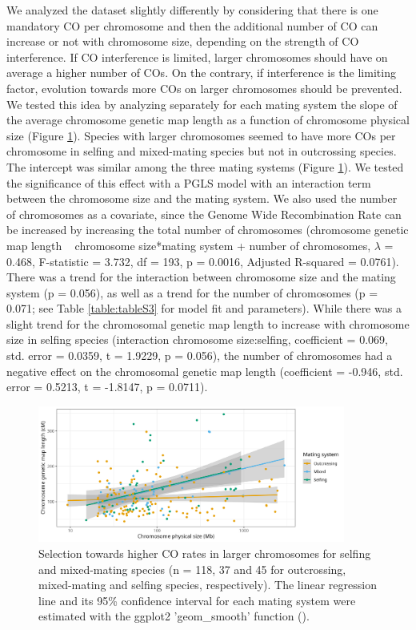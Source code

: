 \documentclass{article}
\begin{document}
We analyzed the dataset slightly differently by considering that there is one mandatory CO per chromosome and then the additional number of CO can increase or not with chromosome size, depending on the strength of CO interference. If CO interference is limited, larger chromosomes should have on average a higher number of COs. On the contrary, if interference is the limiting factor, evolution towards more COs on larger chromosomes should be prevented. We tested this idea by analyzing separately for each mating system the slope of the average chromosome genetic map length as a function of chromosome physical size (Figure \ref{figure:Fig4}). Species with larger chromosomes seemed to have more COs per chromosome in selfing and mixed-mating species but not in outcrossing species. The intercept was similar among the three mating systems (Figure \ref{figure:Fig4}). We tested the significance of this effect with a PGLS model with an interaction term between the chromosome size and the mating system. We also used the number of chromosomes as a covariate, since the Genome Wide Recombination Rate can be increased by increasing the total number of chromosomes (chromosome genetic map length ~ chromosome size*mating system + number of chromosomes, $\lambda$ = 0.468, F-statistic = 3.732, df = 193, p = 0.0016, Adjusted R-squared = 0.0761). There was a trend for the interaction between chromosome size and the mating system (p = 0.056), as well as a trend for the number of chromosomes (p = 0.071; see Table \ref{table:tableS3} for model fit and parameters). While there was a slight trend for the chromosomal genetic map length to increase with chromosome size in selfing species (interaction chromosome size:selfing, coefficient = 0.069, std. error = 0.0359, t = 1.9229, p = 0.056), the number of chromosomes had a negative effect on the chromosomal genetic map length (coefficient = -0.946, std. error = 0.5213, t = -1.8147, p = 0.0711).




\begin{figure}[h!]
  \includegraphics[width=0.9\textwidth]{figures/Fig4.jpeg}
  \centering
  \caption{Selection towards higher CO rates in larger chromosomes for selfing and mixed-mating species (n = 118, 37 and 45 for outcrossing, mixed-mating and selfing species, respectively). The linear regression line and its 95\% confidence interval for each mating system were estimated with the ggplot2 'geom\_smooth' function (\cite{wickhamGgplot2ElegantGraphics2016}).}
  \label{figure:Fig4}
\end{figure}
\end{document}
